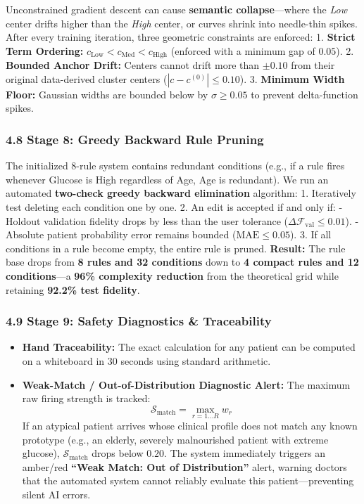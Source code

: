 Unconstrained gradient descent can cause \textbf{semantic
collapse}---where the \emph{Low} center drifts higher than the
\emph{High} center, or curves shrink into needle-thin spikes. After
every training iteration, three geometric constraints are enforced: 1.
\textbf{Strict Term Ordering:}
\(c_{\text{Low}} < c_{\text{Med}} < c_{\text{High}}\) (enforced with a
minimum gap of \(0.05\)). 2. \textbf{Bounded Anchor Drift:} Centers
cannot drift more than \(\pm 0.10\) from their original data-derived
cluster centers (\(|c - c^{(0)}| \le 0.10\)). 3. \textbf{Minimum Width
Floor:} Gaussian widths are bounded below by \(\sigma \ge 0.05\) to
prevent delta-function spikes.

\subsubsection{4.8 Stage 8: Greedy Backward Rule
Pruning}\label{stage-8-greedy-backward-rule-pruning}

The initialized 8-rule system contains redundant conditions (e.g., if a
rule fires whenever Glucose is High regardless of Age, Age is
redundant). We run an automated \textbf{two-check greedy backward
elimination} algorithm: 1. Iteratively test deleting each condition one
by one. 2. An edit is accepted if and only if: - Holdout validation
fidelity drops by less than the user tolerance
(\(\Delta \mathcal{F}_{\text{val}} \le 0.01\)). - Absolute patient
probability error remains bounded (\(\text{MAE} \le 0.05\)). 3. If all
conditions in a rule become empty, the entire rule is pruned.
\textbf{Result:} The rule base drops from \textbf{8 rules and 32
conditions} down to \textbf{4 compact rules and 12 conditions}---a
\textbf{96\% complexity reduction} from the theoretical grid while
retaining \textbf{92.2\% test fidelity}.

\subsubsection{4.9 Stage 9: Safety Diagnostics \&
Traceability}\label{stage-9-safety-diagnostics-traceability}

\begin{itemize}
\tightlist
\item
  \textbf{Hand Traceability:} The exact calculation for any patient can
  be computed on a whiteboard in 30 seconds using standard arithmetic.
\item
  \textbf{Weak-Match / Out-of-Distribution Diagnostic Alert:} The
  maximum raw firing strength is tracked:
  \[\mathcal{S}_{\text{match}} = \max_{r=1 \dots R} w_r\] If an atypical
  patient arrives whose clinical profile does not match any known
  prototype (e.g., an elderly, severely malnourished patient with
  extreme glucose), \(\mathcal{S}_{\text{match}}\) drops below \(0.20\).
  The system immediately triggers an amber/red \textbf{``Weak Match: Out
  of Distribution''} alert, warning doctors that the automated system
  cannot reliably evaluate this patient---preventing silent AI errors.
\end{itemize}

